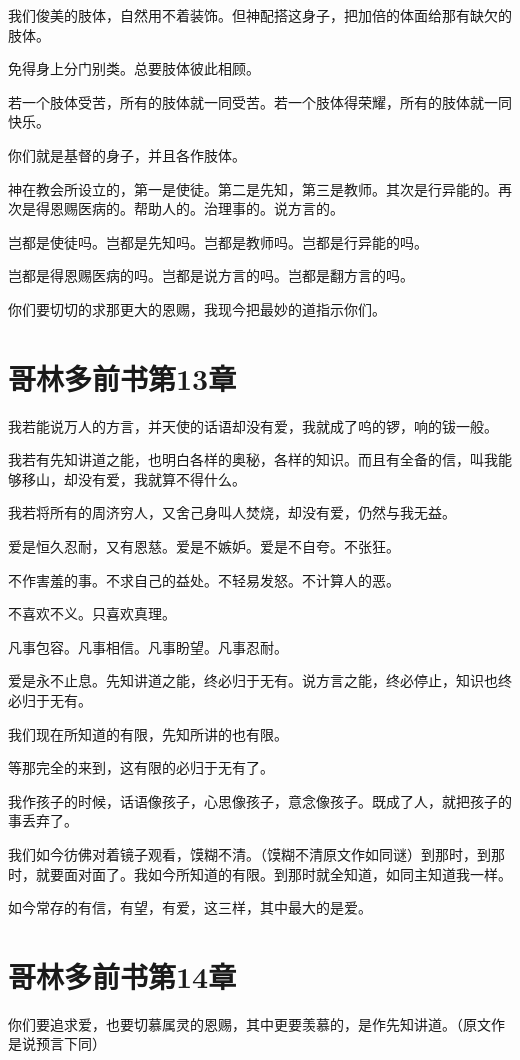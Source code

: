 \documentclass[12pt,oneside]{book}
\begin{document}
我们俊美的肢体，自然用不着装饰。但神配搭这身子，把加倍的体面给那有缺欠的肢体。

免得身上分门别类。总要肢体彼此相顾。

若一个肢体受苦，所有的肢体就一同受苦。若一个肢体得荣耀，所有的肢体就一同快乐。

你们就是基督的身子，并且各作肢体。

神在教会所设立的，第一是使徒。第二是先知，第三是教师。其次是行异能的。再次是得恩赐医病的。帮助人的。治理事的。说方言的。

岂都是使徒吗。岂都是先知吗。岂都是教师吗。岂都是行异能的吗。

岂都是得恩赐医病的吗。岂都是说方言的吗。岂都是翻方言的吗。

你们要切切的求那更大的恩赐，我现今把最妙的道指示你们。

\chapter{哥林多前书第13章}
我若能说万人的方言，并天使的话语却没有爱，我就成了呜的锣，响的钹一般。

我若有先知讲道之能，也明白各样的奥秘，各样的知识。而且有全备的信，叫我能够移山，却没有爱，我就算不得什么。

我若将所有的周济穷人，又舍己身叫人焚烧，却没有爱，仍然与我无益。

爱是恒久忍耐，又有恩慈。爱是不嫉妒。爱是不自夸。不张狂。

不作害羞的事。不求自己的益处。不轻易发怒。不计算人的恶。

不喜欢不义。只喜欢真理。

凡事包容。凡事相信。凡事盼望。凡事忍耐。

爱是永不止息。先知讲道之能，终必归于无有。说方言之能，终必停止，知识也终必归于无有。

我们现在所知道的有限，先知所讲的也有限。

等那完全的来到，这有限的必归于无有了。

我作孩子的时候，话语像孩子，心思像孩子，意念像孩子。既成了人，就把孩子的事丢弃了。

我们如今彷佛对着镜子观看，馍糊不清。（馍糊不清原文作如同谜）到那时，到那时，就要面对面了。我如今所知道的有限。到那时就全知道，如同主知道我一样。

如今常存的有信，有望，有爱，这三样，其中最大的是爱。

\chapter{哥林多前书第14章}
你们要追求爱，也要切慕属灵的恩赐，其中更要羡慕的，是作先知讲道。（原文作是说预言下同）
\end{document}
